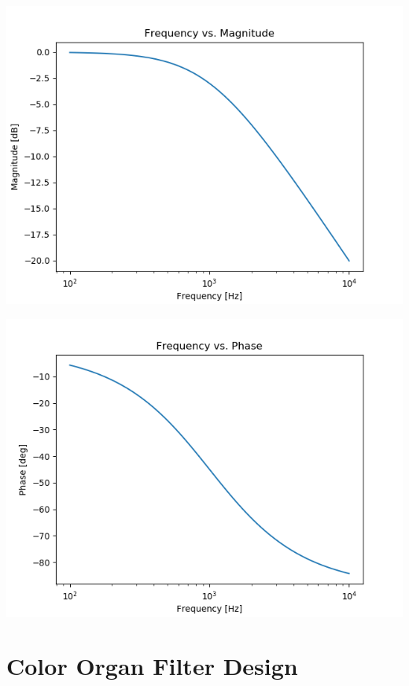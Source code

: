 \documentclass[]{article}
\begin{document}
\begin{center}
	\begin{minipage}{0.5\textwidth}
		\includegraphics[width=\linewidth]{bode_mag}
	\end{minipage}\hfill
	\begin{minipage}{0.5\textwidth}
		\includegraphics[width=\linewidth]{bode_phase}
	\end{minipage}
\end{center}

\section{Color Organ Filter Design}
\end{document}
